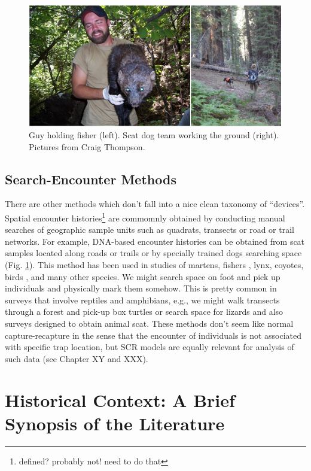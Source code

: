 \begin{figure}
\begin{center}
\includegraphics[width=5in]{Ch1/figs/beardog}
\end{center}
\caption{Guy holding fisher (left). Scat dog team working the ground
  (right). Pictures from Craig Thompson.}
\label{fig.fisherscatdog}
\end{figure}

\subsection{Search-Encounter Methods}

There are other methods which don't fall into a nice clean taxonomy of
``devices''. Spatial encounter histories\footnote{defined? probably
  not! need to do that} are commomnly obtained by conducting manual
searches of geographic sample units such as quadrats, transects or
road or trail networks. 
For example,   
DNA-based encounter histories can be obtained from scat
samples located along roads or trails or by specially trained dogs
\citep{mackay_etal:2008} searching space
(Fig. \ref{fig.fisherscatdog}). This method has been used in studies
of martens, fishers \citep{thompson_etal:inpress}, lynx, coyotes,
birds \citet{kery_etal:2010}, and many other species. We might search
space on foot and pick up individuals and physically mark them
somehow. This is pretty common in surveys that involve reptiles and
amphibians, e.g., we might walk transects through a forest and pick-up
box turtles \citep{hall_etal:1999} or search space for lizards
\citep{royle_young:2008} and also surveys designed to obtain animal
scat. These methods don't seem like normal capture-recapture in the
sense that the encounter of individuals is not associated with
specific trap location, but SCR models are equally relevant for
analysis of such data (see Chapter XY and XXX).


\section{ Historical Context: A Brief Synopsis of the Literature}

